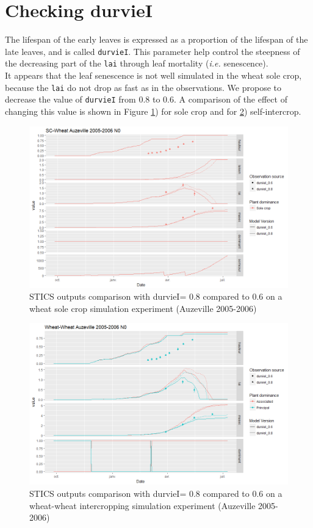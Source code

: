 \documentclass[]{book}
\begin{document}
\hypertarget{checking-durviei}{%
\section{Checking durvieI}\label{checking-durviei}}

The lifespan of the early leaves is expressed as a proportion of the lifespan of the late leaves, and is called \texttt{durvieI}. This parameter help control the steepness of the decreasing part of the \texttt{lai} through leaf mortality (\emph{i.e.} senescence).\\
It appears that the leaf senescence is not well simulated in the wheat sole crop, because the \texttt{lai} do not drop as fast as in the observations. We propose to decrease the value of \texttt{durvieI} from 0.8 to 0.6. A comparison of the effect of changing this value is shown in Figure \ref{fig:durvieISC}) for sole crop and for \ref{fig:durvieIIC}) self-intercrop.

\begin{figure}
\centering
\includegraphics{img/durvieISC.png}
\caption{\label{fig:durvieISC}STICS outputs comparison with durvieI= 0.8 compared to 0.6 on a wheat sole crop simulation experiment (Auzeville 2005-2006)}
\end{figure}

\begin{figure}
\centering
\includegraphics{img/durvieIIC.png}
\caption{\label{fig:durvieIIC}STICS outputs comparison with durvieI= 0.8 compared to 0.6 on a wheat-wheat intercropping simulation experiment (Auzeville 2005-2006)}
\end{figure}
\end{document}
